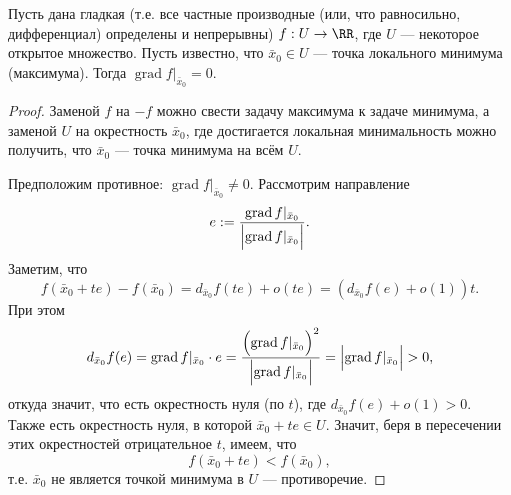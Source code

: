 \documentclass[12pt,a4paper]{article}
\DeclareMathOperator{\grad}{grad}
\begin{document}
    \begin{theorem}
        Пусть дана гладкая (т.е. все частные производные (или, что равносильно, дифференциал) определены и непрерывны) $f: U \to \RR$, где $U$ --- некоторое открытое множество. Пусть известно, что $\bar{x}_0 \in U$ --- точка локального минимума (максимума). Тогда $\grad f|_{\bar{x}_0} = 0$.
    \end{theorem}

    \begin{proof}
        Заменой $f$ на $-f$ можно свести задачу максимума к задаче минимума, а заменой $U$ на окрестность $\bar{x}_0$, где достигается локальная минимальность можно получить, что $\bar{x}_0$ --- точка минимума на всём $U$.

        Предположим противное: $\grad f|_{\bar{x}_0} \neq 0$. Рассмотрим направление
        \[e := \frac{\grad f|_{\bar{x}_0}}{\Bigl|\grad f|_{\bar{x}_0}\Bigr|}.\]
        Заметим, что
        \[
            f(\bar{x}_0 + te) - f(\bar{x}_0)
            = d_{\bar{x}_0}f(te) + o(te)
            = (d_{\bar{x}_0}f(e) + o(1))t.
        \]
        При этом
        \[
            d_{\bar{x}_0}f(e)
            = \grad f|_{\bar{x}_0} \cdot e
            = \frac{\Bigl(\grad f|_{\bar{x}_0}\Bigr)^2}{\Bigl|\grad f|_{\bar{x}_0}\Bigr|}
            = \Bigl|\grad f|_{\bar{x}_0}\Bigr|
            > 0,
        \]
        откуда значит, что есть окрестность нуля (по $t$), где $d_{\bar{x}_0}f(e) + o(1) > 0$. Также есть окрестность нуля, в которой $\bar{x}_0 + te \in U$. Значит, беря в пересечении этих окрестностей отрицательное $t$, имеем, что
        \[f(\bar{x}_0 + te) < f(\bar{x}_0),\]
        т.е. $\bar{x}_0$ не является точкой минимума в $U$ --- противоречие.
    \end{proof}
\end{document}
